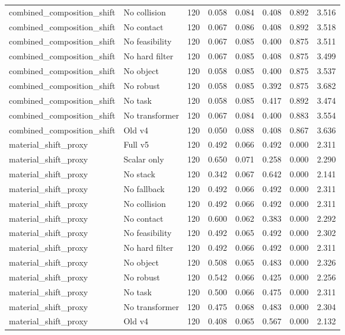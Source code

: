 {\begin{longtable}{llrrrrrr}
combined\_composition\_shift & No collision & 120 & 0.058 & 0.084 & 0.408 & 0.892 & 3.516 \\
combined\_composition\_shift & No contact & 120 & 0.067 & 0.086 & 0.408 & 0.892 & 3.518 \\
combined\_composition\_shift & No feasibility & 120 & 0.067 & 0.085 & 0.400 & 0.875 & 3.511 \\
combined\_composition\_shift & No hard filter & 120 & 0.067 & 0.085 & 0.408 & 0.875 & 3.499 \\
combined\_composition\_shift & No object & 120 & 0.058 & 0.085 & 0.400 & 0.875 & 3.537 \\
combined\_composition\_shift & No robust & 120 & 0.058 & 0.085 & 0.392 & 0.875 & 3.682 \\
combined\_composition\_shift & No task & 120 & 0.058 & 0.085 & 0.417 & 0.892 & 3.474 \\
combined\_composition\_shift & No transformer & 120 & 0.067 & 0.084 & 0.400 & 0.883 & 3.554 \\
combined\_composition\_shift & Old v4 & 120 & 0.050 & 0.088 & 0.408 & 0.867 & 3.636 \\
material\_shift\_proxy & Full v5 & 120 & 0.492 & 0.066 & 0.492 & 0.000 & 2.311 \\
material\_shift\_proxy & Scalar only & 120 & 0.650 & 0.071 & 0.258 & 0.000 & 2.290 \\
material\_shift\_proxy & No stack & 120 & 0.342 & 0.067 & 0.642 & 0.000 & 2.141 \\
material\_shift\_proxy & No fallback & 120 & 0.492 & 0.066 & 0.492 & 0.000 & 2.311 \\
material\_shift\_proxy & No collision & 120 & 0.492 & 0.066 & 0.492 & 0.000 & 2.311 \\
material\_shift\_proxy & No contact & 120 & 0.600 & 0.062 & 0.383 & 0.000 & 2.292 \\
material\_shift\_proxy & No feasibility & 120 & 0.492 & 0.065 & 0.492 & 0.000 & 2.302 \\
material\_shift\_proxy & No hard filter & 120 & 0.492 & 0.066 & 0.492 & 0.000 & 2.311 \\
material\_shift\_proxy & No object & 120 & 0.508 & 0.065 & 0.483 & 0.000 & 2.326 \\
material\_shift\_proxy & No robust & 120 & 0.542 & 0.066 & 0.425 & 0.000 & 2.256 \\
material\_shift\_proxy & No task & 120 & 0.500 & 0.066 & 0.475 & 0.000 & 2.311 \\
material\_shift\_proxy & No transformer & 120 & 0.475 & 0.068 & 0.483 & 0.000 & 2.304 \\
material\_shift\_proxy & Old v4 & 120 & 0.408 & 0.065 & 0.567 & 0.000 & 2.132 \\
\bottomrule
\end{longtable}
}
